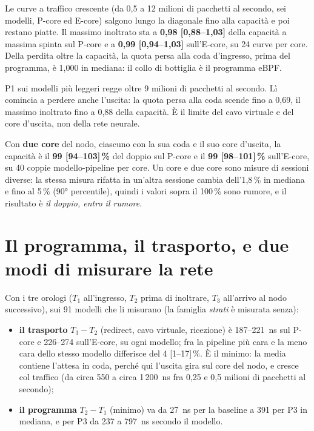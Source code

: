 \documentclass[11pt,a4paper,oneside]{report}
\begin{document}
Le curve a traffico crescente (da 0,5 a 12 milioni di pacchetti al secondo, sei
modelli, P-core ed E-core) salgono lungo la diagonale fino alla capacità e poi
restano piatte. Il massimo inoltrato sta a \textbf{0,98 [0,88--1,03]} della
capacità a massima spinta sul P-core e a \textbf{0,99 [0,94--1,03]} sull'E-core,
su 24 curve per core. Della perdita oltre la capacità, la quota persa alla coda
d'ingresso, prima del programma, è 1,000 in mediana: il collo di bottiglia è il
programma eBPF.

\begin{prima}[L'eccezione]
P1 sui modelli più leggeri regge oltre 9 milioni di pacchetti al secondo. Lì
comincia a perdere anche l'uscita: la quota persa alla coda scende fino a 0,69,
il massimo inoltrato fino a 0,88 della capacità. È il limite del cavo virtuale e
del core d'uscita, non della rete neurale.
\end{prima}

Con \textbf{due core} del nodo, ciascuno con la sua coda e il suo core
d'uscita, la capacità è il \textbf{99 [94--103]\,\%} del doppio sul P-core e il
\textbf{99 [98--101]\,\%} sull'E-core, su 40 coppie modello-pipeline per core.
Un core e due core sono misure di sessioni diverse: la stessa misura rifatta in
un'altra sessione cambia dell'1,8\,\% in mediana e fino al 5\,\% (90° percentile),
quindi i valori sopra il 100\,\% sono rumore, e il risultato è \emph{il doppio,
entro il rumore}.

\section{Il programma, il trasporto, e due modi di misurare la rete}

Con i tre orologi ($T_1$ all'ingresso, $T_2$ prima di inoltrare, $T_3$ all'arrivo
al nodo successivo), sui 91 modelli che li misurano (la famiglia \emph{strati} è
misurata senza):
\begin{itemize}
  \item \textbf{il trasporto} $T_3-T_2$ (redirect, cavo virtuale, ricezione) è
        187--221~ns sul P-core e 226--274 sull'E-core, su ogni modello; fra la
        pipeline più cara e la meno cara dello stesso modello differisce del
        4 [1--17]\,\%. È il minimo: la media contiene l'attesa in coda, perché qui
        l'uscita gira sul core del nodo, e cresce col traffico (da circa 550 a
        circa 1\,200~ns fra 0,25 e 0,5 milioni di pacchetti al secondo);
  \item \textbf{il programma} $T_2-T_1$ (minimo) va da 27~ns per la baseline a 391
        per P3 in mediana, e per P3 da 237 a 797~ns secondo il modello.
\end{itemize}
\end{document}
